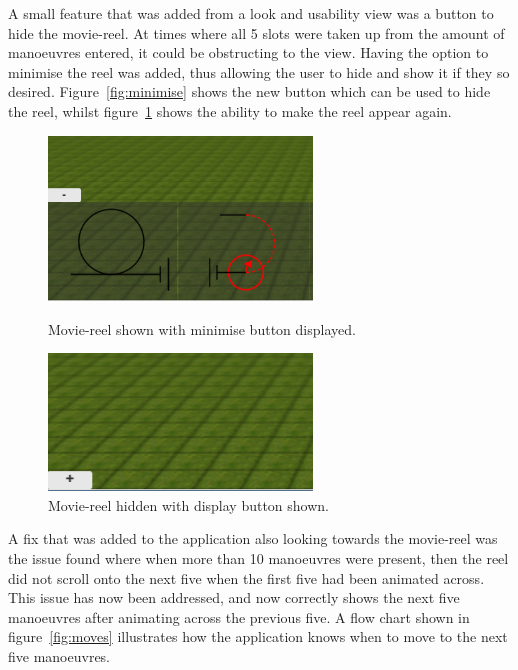 A small feature that was added from a look and usability view was a button to hide the movie-reel. At times where all 5 slots were taken up from the amount of manoeuvres entered, it could be obstructing to the view. Having the option to minimise the reel was added, thus allowing the user to hide and show it if they so desired. Figure~\ref{fig:minimise} shows the new button which can be used to hide the reel, whilst figure~\ref{fig:maxmimise} shows the ability to make the reel appear again.
\begin{figure}[h!]
	\centering
	\parbox{7cm}{
		\includegraphics[width=7cm]{images/minimise.png}
		\caption{Movie-reel shown with minimise button displayed.}
		\label{fig:minimise}}
	\qquad
	\begin{minipage}{7cm}
		\includegraphics[width=7cm]{images/maximise.png}
		\caption{Movie-reel hidden with display button shown.}
		\label{fig:maxmimise}
	\end{minipage}
\end{figure}

A fix that was added to the application also looking towards the movie-reel was the issue found where when more than 10 manoeuvres were present, then the reel did not scroll onto the next five when the first five had been animated across. This issue has now been addressed, and now correctly shows the next five manoeuvres after animating across the previous five. A flow chart shown in figure~\ref{fig:moves} illustrates how the application knows when to move to the next five manoeuvres.

